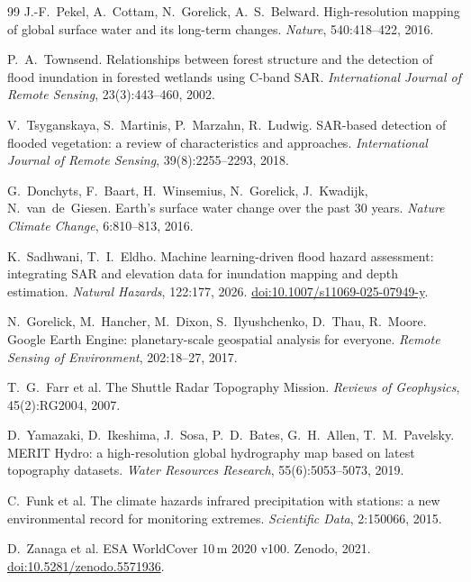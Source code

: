 \documentclass[journal]{IEEEtran}
\begin{document}
\begin{thebibliography}{99}
J.-F.~Pekel, A.~Cottam, N.~Gorelick, A.~S.~Belward.
High-resolution mapping of global surface water and its long-term changes.
\emph{Nature}, 540:418--422, 2016.

P.~A.~Townsend.
Relationships between forest structure and the detection of flood inundation in
forested wetlands using C-band SAR.
\emph{International Journal of Remote Sensing}, 23(3):443--460, 2002.

V.~Tsyganskaya, S.~Martinis, P.~Marzahn, R.~Ludwig.
SAR-based detection of flooded vegetation: a review of characteristics and
approaches.
\emph{International Journal of Remote Sensing}, 39(8):2255--2293, 2018.

G.~Donchyts, F.~Baart, H.~Winsemius, N.~Gorelick, J.~Kwadijk, N.~van~de~Giesen.
Earth's surface water change over the past 30 years.
\emph{Nature Climate Change}, 6:810--813, 2016.

K.~Sadhwani, T.~I.~Eldho.
Machine learning-driven flood hazard assessment: integrating SAR and elevation
data for inundation mapping and depth estimation.
\emph{Natural Hazards}, 122:177, 2026.
\href{https://doi.org/10.1007/s11069-025-07949-y}{doi:10.1007/s11069-025-07949-y}.

N.~Gorelick, M.~Hancher, M.~Dixon, S.~Ilyushchenko, D.~Thau, R.~Moore.
Google Earth Engine: planetary-scale geospatial analysis for everyone.
\emph{Remote Sensing of Environment}, 202:18--27, 2017.

T.~G.~Farr et al.
The Shuttle Radar Topography Mission.
\emph{Reviews of Geophysics}, 45(2):RG2004, 2007.

D.~Yamazaki, D.~Ikeshima, J.~Sosa, P.~D.~Bates, G.~H.~Allen, T.~M.~Pavelsky.
MERIT Hydro: a high-resolution global hydrography map based on latest topography
datasets.
\emph{Water Resources Research}, 55(6):5053--5073, 2019.

C.~Funk et al.
The climate hazards infrared precipitation with stations: a new environmental
record for monitoring extremes.
\emph{Scientific Data}, 2:150066, 2015.

D.~Zanaga et al. ESA WorldCover 10\,m 2020 v100. Zenodo, 2021.
\href{https://doi.org/10.5281/zenodo.5571936}{doi:10.5281/zenodo.5571936}.


\end{thebibliography}
\end{document}
